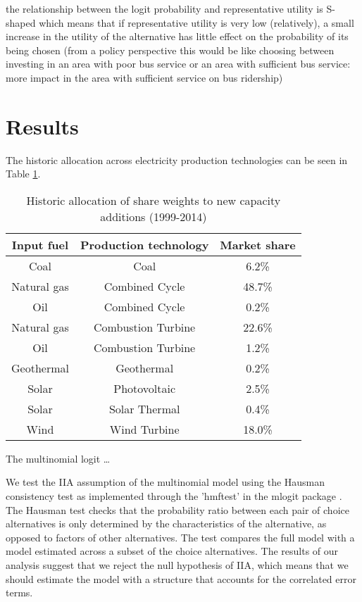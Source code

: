 \documentclass[10pt]{amsart}
\begin{document}
the relationship between the logit probability and representative utility is S-shaped which means that if representative utility is very low (relatively), a small increase in the utility of the alternative has little effect on the probability of its being chosen (from a policy perspective this would be like choosing between investing in an area with poor bus service or an area with sufficient bus service: more impact in the area with sufficient service on bus ridership)

\section{Results}
The historic allocation across electricity production technologies can be seen in Table \ref{table:perc}.

\begin{table}[H]
\caption{Historic allocation of share weights to new capacity additions (1999-2014)}
\centering
\begin{tabular}{c c c}
\hline
\hline
Input fuel & Production technology & Market share \\ [0.5ex]
\hline
Coal & Coal & 6.2\% \\
Natural gas & Combined Cycle & 48.7\% \\
Oil & Combined Cycle & 0.2\% \\
Natural gas & Combustion Turbine & 22.6\% \\
Oil & Combustion Turbine & 1.2\% \\
Geothermal & Geothermal & 0.2\% \\
Solar & Photovoltaic & 2.5\% \\
Solar & Solar Thermal & 0.4\% \\
Wind & Wind Turbine & 18.0\% \\ [1ex]
\hline
\end{tabular}
\label{table:perc}
\end{table}

The multinomial logit \ldots

We test the IIA assumption of the multinomial model using the Hausman consistency test as implemented through the 'hmftest' in the mlogit package \parencite{mlogit2013}. 
The Hausman test checks that the probability ratio between each pair of choice alternatives is only determined by the characteristics of the alternative, as opposed to factors of other alternatives. 
The test compares the full model with a model estimated across a subset of the choice alternatives.
The results of our analysis suggest that we reject the null hypothesis of IIA, which means that we should estimate the model with a structure that accounts for the correlated error terms.  
\end{document}
